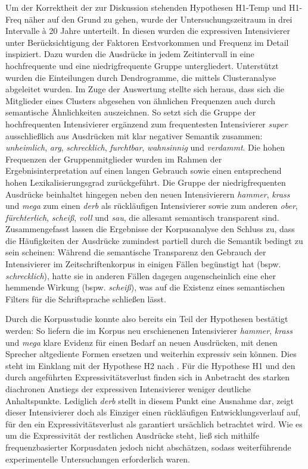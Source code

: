 Um der Korrektheit der zur Diskussion stehenden Hypothesen H1-Temp und H1-Freq näher auf den Grund zu gehen, wurde der Untersuchungszeitraum in drei Intervalle à 20 Jahre unterteilt. In diesen wurden die expressiven Intensivierer unter Berücksichtigung der Faktoren Erstvorkommen und Frequenz im Detail inspiziert. Dazu wurden die Ausdrücke in jedem Zeitintervall in eine hochfrequente und eine niedrigfrequente Gruppe untergliedert. Unterstützt wurden die Einteilungen durch Dendrogramme, die mittels Clusteranalyse abgeleitet wurden. Im Zuge der Auswertung stellte sich heraus, dass sich die Mitglieder eines Clusters abgesehen von ähnlichen Frequenzen auch durch semantische Ähnlichkeiten auszeichnen. So setzt sich die Gruppe der hochfrequenten Intensivierer ergänzend zum frequentesten Intensivierer \textit{super} ausschließlich aus Ausdrücken mit klar negativer Semantik zusammen: \textit{unheimlich}, \textit{arg}, \textit{schrecklich}, \textit{furchtbar}, \textit{wahnsinnig} und \textit{verdammt}. Die hohen Frequenzen der Gruppenmitglieder wurden im Rahmen der Ergebnisinterpretation auf einen langen Gebrauch sowie einen entsprechend hohen Lexikalisierungsgrad zurückgeführt. Die Gruppe der niedrigfrequenten Ausdrücke beinhaltet hingegen neben den neuen Intensivierern \textit{hammer}, \textit{krass} und \textit{mega} zum einen \textit{derb} als rückläufigen Intensivierer sowie zum anderen \textit{ober}, \textit{fürchterlich}, \textit{scheiß}, \textit{voll} und \textit{sau}, die allesamt semantisch transparent sind. Zusammengefasst lassen die Ergebnisse der Korpusanalyse den Schluss zu, dass die Häufigkeiten der Ausdrücke zumindest partiell durch die Semantik bedingt zu sein scheinen: Während die semantische Transparenz den Gebrauch der Intensivierer im Zeitschriftenkorpus in einigen Fällen begünstigt hat (bspw. \textit{schrecklich}), hatte sie in anderen Fällen dagegen augenscheinlich eine eher hemmende Wirkung (bspw. \textit{scheiß}), was auf die Existenz eines semantischen Filters für die Schriftsprache schließen lässt.


Durch die Korpusstudie konnte also bereits ein Teil der Hypothesen bestätigt werden: So liefern die im Korpus neu erschienenen Intensivierer \textit{hammer}, \textit{krass} und \textit{mega} klare Evidenz für einen Bedarf an neuen Ausdrücken, mit denen Sprecher altgediente Formen ersetzen und weiterhin expressiv sein können. Dies steht im Einklang mit der Hypothese H2 nach \citet[274]{Baumgarten.1908}. Für die Hypothese H1 und den durch \citet[2]{Hauschild.1899} angeführten Expressivitätsverlust finden sich in Anbetracht des starken diachronen Anstiegs der expressiven Intensivierer weniger deutliche Anhaltspunkte. Lediglich \textit{derb} stellt in diesem Punkt eine Ausnahme dar, zeigt dieser Intensivierer doch als Einziger einen rückläufigen Entwicklungsverlauf auf, für den ein Expressivitätsverlust als garantiert ursächlich betrachtet wird. Wie es um die Expressivität der restlichen Ausdrücke steht, ließ sich mithilfe frequenzbasierter Korpusdaten jedoch nicht abschätzen, sodass weiterführende experimentelle Untersuchungen erforderlich waren.


